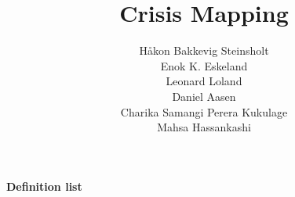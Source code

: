 \documentclass[pdftex,12pt,final,a4paper]{report}
\author{Håkon Bakkevig Steinsholt \\
Enok K. Eskeland \\
Leonard Loland \\
Daniel Aasen \\
Charika Samangi Perera Kukulage \\
Mahsa Hassankashi }
\begin{document}
\title{Crisis Mapping}
\maketitle







%
%

\tableofcontents 

\listoffigures

\listoftables


\pagebreak
\thispagestyle{plain}
\begin{Huge}
\label{definitions}
\begin{flushleft}

\bf Definition list
\end{flushleft}
\end{Huge}



%
%
%
%
%
%
%








%	
%	




%
%
\end{document}
